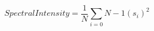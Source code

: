 \begin{equation}
\mathit{SpectralIntensity} = \frac{1}{N} \sum_{i=0}{N-1} (s_i)^2
\label{formula_spectral_intensity}
\end{equation}
